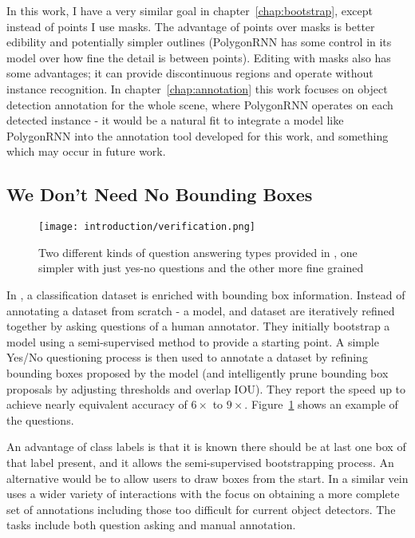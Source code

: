 In this work, I have a very similar goal in chapter~\ref{chap:bootstrap}, except instead of points I use masks. The advantage of points over masks is better edibility and potentially simpler outlines (PolygonRNN has some control in its model over how fine the detail is between points). Editing with masks also has some advantages; it can provide discontinuous regions and operate without instance recognition. In chapter~\ref{chap:annotation} this work focuses on object detection annotation for the whole scene, where PolygonRNN operates on each detected instance - it would be a natural fit to integrate a model like PolygonRNN into the annotation tool developed for this work, and something which may occur in future work.


\subsection {We Don't Need No Bounding Boxes}

\begin{figure}[h]
  \centering
  \texttt{[image: introduction/verification.png]}
  \caption{Two different kinds of question answering types provided in \cite{Papadopoulos2016}, one simpler with just yes-no questions and the other more fine grained}
  \label{fig:verification}
\end{figure}

In \cite{Papadopoulos2016}, a classification dataset is enriched with bounding box information. Instead of annotating a dataset from scratch - a model, and dataset are iteratively refined together by asking questions of a human annotator. They initially bootstrap a model using a semi-supervised method  \cite{Cinbis2017} to provide a starting point. A simple Yes/No questioning process is then used to annotate a dataset by refining bounding boxes proposed by the model (and intelligently prune bounding box proposals by adjusting thresholds and overlap \gls{IOU}). They report the speed up to achieve nearly equivalent accuracy of $6\times$ to $9\times$.  Figure~\ref{fig:verification} shows an example of the questions.

An advantage of class labels is that it is known there should be at last one box of that label present, and it allows the semi-supervised bootstrapping process. An alternative would be to allow users to draw boxes from the start. In a similar vein \cite{Russakovsky2015a} uses a wider variety of interactions with the focus on obtaining a more complete set of annotations including those too difficult for current object detectors. The tasks include both question asking and manual annotation.


